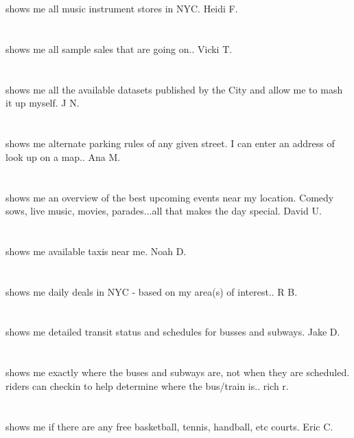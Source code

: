 \section{}shows me all music instrument stores in NYC. Heidi F.
\section{}shows me all sample sales that are going on.. Vicki T.
\section{}shows me all the available datasets published by the City and allow me to mash it up myself. J N.
\section{}shows me alternate parking rules of any given street. I can enter an address of look up on a map.. Ana M.
\section{}shows me an overview of the best upcoming events near my location. Comedy sows,  live music,  movies,  parades...all that makes the day special. David U.
\section{}shows me available taxis near me. Noah D.
\section{}shows me daily deals in NYC - based on my area(s) of interest.. R B.
\section{}shows me detailed transit status and schedules for busses and subways. Jake D.
\section{}shows me exactly where the buses and subways are,  not when they are scheduled. riders can checkin to help determine where the bus/train is.. rich r.
\section{} shows me if there are any free basketball,  tennis,  handball,  etc courts. Eric C.
